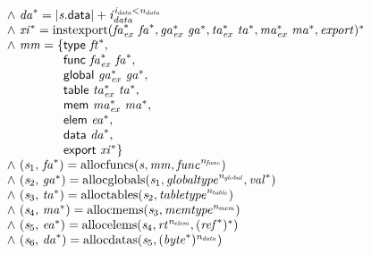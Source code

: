 $$\begin{array}{@{}lcl@{}l@{}}
 &&&\quad {\land}~{{\mathit{da}}^\ast} = {{|{\mathit{s}}.\mathsf{data}|} + {\mathit{i}}_{{\mathit{data}}}^{{\mathit{i}}_{{\mathit{data}}}<{\mathit{n}}_{{\mathit{data}}}}} \\
 &&&\quad {\land}~{{\mathit{xi}}^\ast} = {{\mathrm{instexport}}({{\mathit{fa}}_{{\mathit{ex}}}^\ast}~{{\mathit{fa}}^\ast}, {{\mathit{ga}}_{{\mathit{ex}}}^\ast}~{{\mathit{ga}}^\ast}, {{\mathit{ta}}_{{\mathit{ex}}}^\ast}~{{\mathit{ta}}^\ast}, {{\mathit{ma}}_{{\mathit{ex}}}^\ast}~{{\mathit{ma}}^\ast}, {\mathit{export}})^\ast} \\
 &&&\quad {\land}~{\mathit{mm}} = \{ \begin{array}[t]{@{}l@{}}
\mathsf{type}~{{\mathit{ft}}^\ast},\; \\
  \mathsf{func}~{{\mathit{fa}}_{{\mathit{ex}}}^\ast}~{{\mathit{fa}}^\ast},\; \\
  \mathsf{global}~{{\mathit{ga}}_{{\mathit{ex}}}^\ast}~{{\mathit{ga}}^\ast},\; \\
  \mathsf{table}~{{\mathit{ta}}_{{\mathit{ex}}}^\ast}~{{\mathit{ta}}^\ast},\; \\
  \mathsf{mem}~{{\mathit{ma}}_{{\mathit{ex}}}^\ast}~{{\mathit{ma}}^\ast},\; \\
  \mathsf{elem}~{{\mathit{ea}}^\ast},\; \\
  \mathsf{data}~{{\mathit{da}}^\ast},\; \\
  \mathsf{export}~{{\mathit{xi}}^\ast} \}\end{array} \\
 &&&\quad {\land}~({\mathit{s}}_{{1}},\, {{\mathit{fa}}^\ast}) = {\mathrm{allocfuncs}}({\mathit{s}}, {\mathit{mm}}, {{\mathit{func}}^{{\mathit{n}}_{{\mathit{func}}}}}) \\
 &&&\quad {\land}~({\mathit{s}}_{{2}},\, {{\mathit{ga}}^\ast}) = {\mathrm{allocglobals}}({\mathit{s}}_{{1}}, {{\mathit{globaltype}}^{{\mathit{n}}_{{\mathit{global}}}}}, {{\mathit{val}}^\ast}) \\
 &&&\quad {\land}~({\mathit{s}}_{{3}},\, {{\mathit{ta}}^\ast}) = {\mathrm{alloctables}}({\mathit{s}}_{{2}}, {{\mathit{tabletype}}^{{\mathit{n}}_{{\mathit{table}}}}}) \\
 &&&\quad {\land}~({\mathit{s}}_{{4}},\, {{\mathit{ma}}^\ast}) = {\mathrm{allocmems}}({\mathit{s}}_{{3}}, {{\mathit{memtype}}^{{\mathit{n}}_{{\mathit{mem}}}}}) \\
 &&&\quad {\land}~({\mathit{s}}_{{5}},\, {{\mathit{ea}}^\ast}) = {\mathrm{allocelems}}({\mathit{s}}_{{4}}, {{\mathit{rt}}^{{\mathit{n}}_{{\mathit{elem}}}}}, {({{\mathit{ref}}^\ast})^\ast}) \\
 &&&\quad {\land}~({\mathit{s}}_{{6}},\, {{\mathit{da}}^\ast}) = {\mathrm{allocdatas}}({\mathit{s}}_{{5}}, {({{\mathit{byte}}^\ast})^{{\mathit{n}}_{{\mathit{data}}}}}) \\
\end{array}
$$

